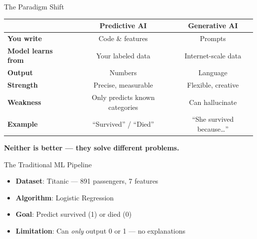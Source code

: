 \documentclass[aspectratio=169,12pt]{beamer}
\begin{document}
\begin{frame}{The Paradigm Shift}
\begin{center}
\renewcommand{\arraystretch}{1.4}
\begin{tabular}{l c c}
\toprule
& \textcolor{predictblue}{\textbf{Predictive AI}} & \textcolor{gengreen}{\textbf{Generative AI}} \\
\midrule
\textbf{You write} & Code \& features & Prompts \\
\textbf{Model learns from} & Your labeled data & Internet-scale data \\
\textbf{Output} & Numbers & Language \\
\textbf{Strength} & Precise, measurable & Flexible, creative \\
\textbf{Weakness} & Only predicts known categories & Can hallucinate \\
\textbf{Example} & ``Survived'' / ``Died'' & ``She survived because\ldots'' \\
\bottomrule
\end{tabular}
\end{center}
\vspace{0.5cm}
\begin{center}
\Large\textbf{Neither is better --- they solve different problems.}
\end{center}
\end{frame}

\begin{frame}{The Traditional ML Pipeline}
\begin{center}
\end{center}
\vspace{0.8cm}
\begin{itemize}
\item \textbf{Dataset}: Titanic --- 891 passengers, 7 features
\item \textbf{Algorithm}: Logistic Regression
\item \textbf{Goal}: Predict survived (1) or died (0)
\item \textbf{Limitation}: Can \textit{only} output 0 or 1 --- no explanations
\end{itemize}
\end{frame}
\end{document}
